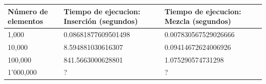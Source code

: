 \documentclass[11pt]{article}
\begin{document}
\begin{longtable}[]{@{}lll@{}}
\toprule
\begin{minipage}[b]{0.16\columnwidth}\raggedright\strut
Número de elementos\strut
\end{minipage} & \begin{minipage}[b]{0.18\columnwidth}\raggedright\strut
Tiempo de ejecucion: Inserción (segundos)\strut
\end{minipage} & \begin{minipage}[b]{0.18\columnwidth}\raggedright\strut
Tiempo de ejecucion: Mezcla (segundos)\strut
\end{minipage}\tabularnewline
\midrule
\endhead
\begin{minipage}[t]{0.16\columnwidth}\raggedright\strut
1,000\strut
\end{minipage} & \begin{minipage}[t]{0.18\columnwidth}\raggedright\strut
0.08681877609501498\strut
\end{minipage} & \begin{minipage}[t]{0.18\columnwidth}\raggedright\strut
0.007830567529026666\strut
\end{minipage}\tabularnewline
\begin{minipage}[t]{0.16\columnwidth}\raggedright\strut
10,000\strut
\end{minipage} & \begin{minipage}[t]{0.18\columnwidth}\raggedright\strut
8.594881030616307\strut
\end{minipage} & \begin{minipage}[t]{0.18\columnwidth}\raggedright\strut
0.09414672624006926\strut
\end{minipage}\tabularnewline
\begin{minipage}[t]{0.16\columnwidth}\raggedright\strut
100,000\strut
\end{minipage} & \begin{minipage}[t]{0.18\columnwidth}\raggedright\strut
841.5663000628801\strut
\end{minipage} & \begin{minipage}[t]{0.18\columnwidth}\raggedright\strut
1.075290574731298\strut
\end{minipage}\tabularnewline
\begin{minipage}[t]{0.16\columnwidth}\raggedright\strut
1'000,000\strut
\end{minipage} & \begin{minipage}[t]{0.18\columnwidth}\raggedright\strut
?\strut
\end{minipage} & \begin{minipage}[t]{0.18\columnwidth}\raggedright\strut
?\strut
\end{minipage}\tabularnewline
\bottomrule
\end{longtable}
\end{document}
